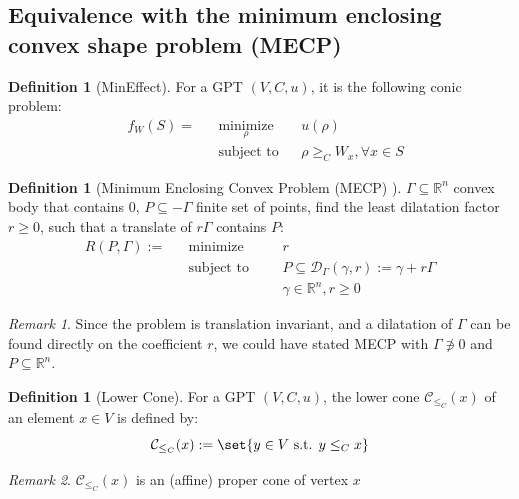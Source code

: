 \documentclass{article}
\theoremstyle{definition}
\newtheorem{defi}[theo]{Definition}
\theoremstyle{remark}
\newtheorem*{rk}{Remark}
\DeclareMathOperator{\mini}{\text{minimize}}
\DeclareMathOperator{\st}{\text{subject to}}
\begin{document}
\subsection{Equivalence with the minimum enclosing convex shape problem (MECP)}
\begin{defi}[MinEffect]
  For a GPT $(V,C,u)$, it is the following conic problem:
  \begin{equation}
    \begin{aligned}
      &f_W(S) =&& \underset{\rho}{\mini} && u(\rho) \\
      &&& \st && \rho \geq_C  W_x, \forall x \in S
      \end{aligned}
  \end{equation}
\end{defi}

\begin{defi}[Minimum Enclosing Convex Problem (MECP) \cite{BK13}]
  $\Gamma \subseteq \mathbb{R}^n$ convex body that contains $0$, $P \subseteq -\Gamma$ finite set of points, find the least dilatation factor $r \geq 0$, such that a translate of $r\Gamma$ contains $P$:
  \begin{equation}
    \begin{aligned}
      R(P,\Gamma) := && \mini &&& r\\
      && \st &&& P \subseteq \mathcal{D}_{\Gamma}(\gamma,r) := \gamma + r\Gamma \\
      && &&& \gamma \in \mathbb{R}^n, r \geq 0
    \end{aligned}
  \end{equation}
\end{defi}

\begin{rk}
  Since the problem is translation invariant, and a dilatation of $\Gamma$ can be found directly on the coefficient $r$, we could have stated MECP with $\Gamma \not\ni 0$ and $P \subseteq \mathbb{R}^n$.
\end{rk}

\begin{defi}[Lower Cone]
  For a GPT $(V,C,u)$, the lower cone $\mathcal{C}_{\leq_C}(x)$ of an element $x \in V$ is defined by:
  \[ \mathcal{C}_{\leq_C}(x) := \set{y \in V \text{ s.t. } y \leq_C x}\]
\end{defi}

\begin{rk}
  $\mathcal{C}_{\leq_C}(x)$ is an (affine) proper cone of vertex $x$
\end{rk}
\end{document}
